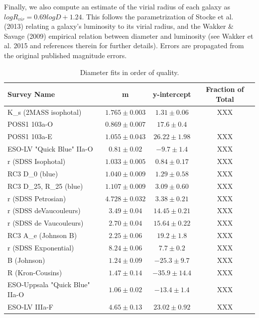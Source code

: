 \documentclass[iop]{emulateapj-rtx4}
\begin{document}
Finally, we also compute an estimate of the virial radius of each galaxy as $log R_{vir} = 0.69 log D + 1.24$. This follows the parametrization of Stocke et al. (2013) relating a galaxy's luminosity to its virial radius, and the Wakker $\&$ Savage (2009) empirical relation between diameter and luminosity (see Wakker et al. 2015 and references therein for further details). Errors are propagated from the original published magnitude errors.


\begin{table}[ht]\footnotesize
\begin{center}
\begin{tabular}{l c c c}
 \hline \hline
 Survey Name                			& m   				& y-intercept			& Fraction of Total	\\
  \hline \hline 
K\_s (2MASS isophotal)			& $1.765 \pm 0.003$		& $1.31 \pm 0.06$		&	XXX			\\
POSS1 103a-O					& $0.869 \pm  0.007$	& $17.6 \pm 0.4$						\\
POSS1 103a-E					& $1.055 \pm 0.043$		& $26.22 \pm 1.98$		&	XXX			\\
ESO-LV "Quick Blue" IIa-O		& $0.81 \pm 0.02$		& $-9.7 \pm 1.4$		&	XXX			\\
r (SDSS Isophotal)				& $1.033 \pm 0.005$		& $0.84 \pm 0.17$		&	XXX			\\
RC3 D\_0 (blue)				& $1.040 \pm 0.009$		& $1.29 \pm 0.58$		&	XXX			\\
RC3 D\_25, R\_25 (blue)			& $1.107 \pm 0.009$		& $3.09 \pm 0.60$		&	XXX			\\
r (SDSS Petrosian)				& $4.728 \pm 0.032$		& $3.38 \pm 0.21$		&	XXX			\\
r (SDSS deVaucouleurs)			& $3.49 \pm 0.04$		& $14.45 \pm 0.21$		&	XXX			\\
r (SDSS de Vaucouleurs)			& $2.70 \pm 0.04$		& $15.64 \pm 0.22$		&	XXX			\\
RC3 A\_e (Johnson B)			& $2.25 \pm 0.06$		& $19.2 \pm 1.8$		&	XXX			\\
r (SDSS Exponential)			& $8.24 \pm 0.06$		& $7.7 \pm 0.2$		&	XXX			\\
B (Johnson)					& $1.24 \pm 0.09$		& $-25.3 \pm 9.7$		&	XXX			\\
R (Kron-Cousins)				& $1.47 \pm 0.14$		& $-35.9 \pm 14.4$		&	XXX			\\
ESO-Uppsala "Quick Blue" IIa-O	& $1.06 \pm 0.02$		& $-13.4 \pm 1.4$		&	XXX			\\
ESO-LV IIIa-F					& $4.65 \pm 0.13$		& $23.02 \pm 0.92$		&	XXX			\\
\hline
\end{tabular}
\end{center}
  \caption{\small{Diameter fits in order of quality.}}
  \label{diameter_fits}
\end{table}
\end{document}
